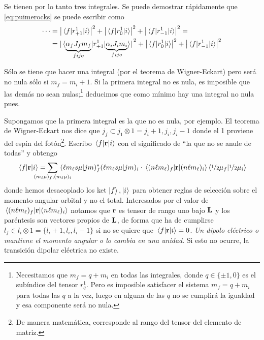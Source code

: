 Se tienen por lo tanto tres integrales. Se puede demostrar rápidamente
 que \eqref{eq:puimerocks} se puede escribir como
\begin{equation}
  \begin{split}
    \cdots &= \abs{\mel{f}{r_{+1}^1}{i}}^2 +
    \abs{\mel{f}{r_{0}^1}{i}}^2 +
    \abs{\mel{f}{r_{-1}^1}{i}}^2 = \\
    &= \abs*{\mel*{\underbrace{\alpha_fJ_f
          m_f}_{fijo}}{r_{+1}^1}{\underbrace{\alpha_i J_i m_i}_{fijo}}}^2
    + \abs{\mel{f}{r_0^1}{i}}^2 + \abs{\mel{f}{r_{-1}^1}{i}}^2
  \end{split}
\end{equation}


Sólo se tiene que hacer una integral (por el teorema de Wigner-Eckart)
pero será no nula sólo si
$m_f=m_i+1$. Si la primera integral no es nula, es imposible que las demás no
sean nulas;\footnote{Necesitamos que $m_f=q+m_i$ en todas las
  integrales, donde $q\in\{\pm1,0\}$ es el subíndice del tensor
  $r_q^1$. Pero es imposible satisfacer el sistema $m_f=q+m_i$ para
  todas las $q$ a la vez, luego en alguna de las $q$ no se cumplirá la
igualdad y esa componente será no nula.} deducimos que como mínimo hay una integral no nula pues.

Supongamos que la primera integral es la que no es nula, por ejemplo.
El teorema de Wigner-Eckart nos dice que $j_f \subset j_1 \otimes 1 = j_i+1, j_i,
j_i -1$ donde el 1 proviene del espín del fotón\footnote{De manera
  matemática, corresponde al rango del tensor del elemento de matriz.}. Escribo
$\mel{f}{\bm{\mathrm{r}}}{i}$ con el
significado de ``la que no se anule de todas'' y obtengo
\begin{equation}
\mel{f}{\boldrm{r}}{i} = \sum_{\mathclap{(m_\ell \mu)_f, (m_\ell \mu)_i}}\  (\ell m_\ell s \mu
| j m)_f^* (\ell m_\ell s\mu | jm)_i \cdot
\mel{(n\ell m_\ell)_f}{\boldrm{r}}{(n\ell m_\ell)_i} \braket{ \oh \mu_f}{\oh \mu_i}
\end{equation}
donde hemos desacoplado los ket $\ket{f},\ket{i}$ para obtener reglas
de selección sobre el momento angular orbital y no el total.
Interesados por el valor de $\mel{(n\ell m_\ell)_f}{\bm{\mathrm{r}}}{(n\ell
  m_\ell)_i} $ notamos que $\bm{\mathrm{r}}$ es tensor de rango uno bajo $\bm{\mathrm{L}}$ y los
paréntesis son vectores propios de $\bm{\mathrm{L}}$, de forma que ha de cumplirse $l_f \in
l_i \otimes 1 = \{l_i+1,l_i,l_i-1\}$ si no se quiere que
$\mel{f}{\bm{\mathrm{r}}}{i}=0$. \emph{Un dipolo eléctrico o mantiene el momento
angular o lo cambia en una unidad}. Si esto no ocurre, la transición
dipolar eléctrica no existe.

